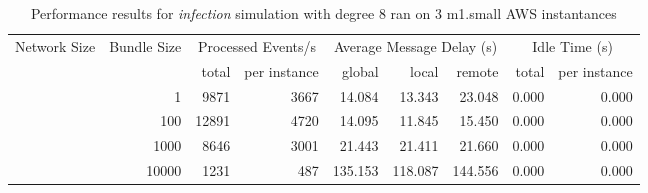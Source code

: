 \begin{table}
	  \caption[Performance results, \emph{infection:8 on 3 m1.small instances }]{ Performance results for \emph{ infection } simulation with degree 8 ran on 3 m1.small AWS instantances }
	\begin{tabular}{rrrrrrrrr}
	\hline\noalign{\smallskip}

	Network Size &
	Bundle Size &
	\multicolumn{2}{c}{Processed Events/s} & 
	\multicolumn{3}{c}{Average Message Delay (s)} & 
	\multicolumn{2}{c}{Idle Time (s)}  \\

	 & 
	 & 
	 total & per instance
     & global & local & remote
     & total & per instance\\

			
				\noalign{\smallskip}\hline
				\multirow{ 4 }{*}{ 40000 } &
				
					
					 
					\multirow{ 1 }{*}{ 1 } &
					
						
							    
							     9871  & 3667  
	                           & 14.084 & 13.343 & 23.048
	                           & 0.000 & 0.000  \\
	                
	            
					 &  
					 
					\multirow{ 1 }{*}{ 100 } &
					
						
							    
							     12891  & 4720  
	                           & 14.095 & 11.845 & 15.450
	                           & 0.000 & 0.000  \\
	                
	            
					 &  
					 
					\multirow{ 1 }{*}{ 1000 } &
					
						
							    
							     8646  & 3001  
	                           & 21.443 & 21.411 & 21.660
	                           & 0.000 & 0.000  \\
	                
	            
					 &  
					 
					\multirow{ 1 }{*}{ 10000 } &
					
						
							    
							     1231  & 487  
	                           & 135.153 & 118.087 & 144.556
	                           & 0.000 & 0.000  \\
	                

\end{tabular}
\end{table}
